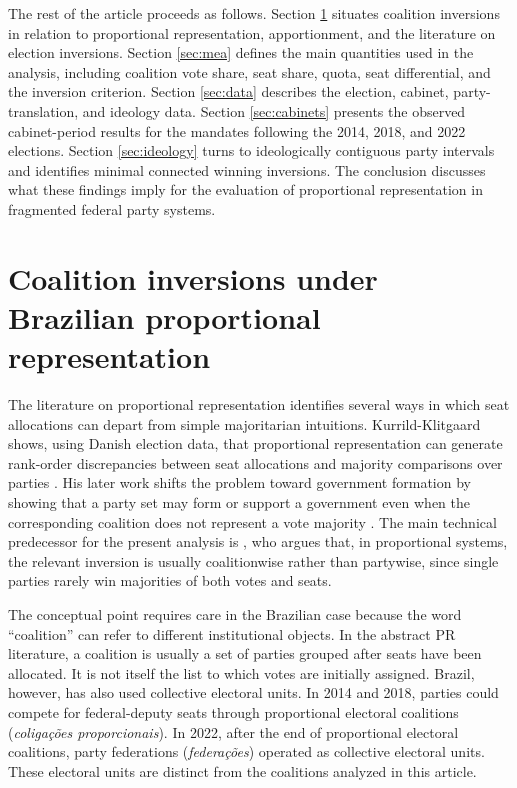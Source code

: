 \documentclass[11pt]{article}
\begin{document}
The rest of the article proceeds as follows. Section \ref{sec:theory} situates coalition inversions in relation to proportional representation, apportionment, and the literature on election inversions. Section \ref{sec:mea} defines the main quantities used in the analysis, including coalition vote share, seat share, quota, seat differential, and the inversion criterion. Section \ref{sec:data} describes the election, cabinet, party-translation, and ideology data. Section \ref{sec:cabinets} presents the observed cabinet-period results for the mandates following the 2014, 2018, and 2022 elections. Section \ref{sec:ideology} turns to ideologically contiguous party intervals and identifies minimal connected winning inversions. The conclusion discusses what these findings imply for the evaluation of proportional representation in fragmented federal party systems.




\section{Coalition inversions under Brazilian proportional representation}
\label{sec:theory}

The literature on proportional representation identifies several ways in which
seat allocations can depart from simple majoritarian intuitions. Kurrild-Klitgaard
shows, using Danish election data, that proportional representation can generate
rank-order discrepancies between seat allocations and majority comparisons over
parties \parencite{kurrild2008voting}. His later work shifts the problem toward
government formation by showing that a party set may form or support a government
even when the corresponding coalition does not represent a vote majority
\parencite{kurrild-klitgaard13_elect_inver_coalit_propor_repres}. The main
technical predecessor for the present analysis is
\textcite{miller14_elect_inver_under_propor_repres}, who argues that, in
proportional systems, the relevant inversion is usually coalitionwise rather than
partywise, since single parties rarely win majorities of both votes and seats.

The conceptual point requires care in the Brazilian case because the word
``coalition'' can refer to different institutional objects. In the abstract PR
literature, a coalition is usually a set of parties grouped after seats have been
allocated. It is not itself the list to which votes are initially assigned. Brazil,
however, has also used collective electoral units. In 2014 and 2018, parties
could compete for federal-deputy seats through proportional electoral coalitions
(\emph{coligações proporcionais}). In 2022, after the end of proportional
electoral coalitions, party federations (\emph{federações}) operated as collective
electoral units. These electoral units are distinct from the coalitions analyzed
in this article.
\end{document}
